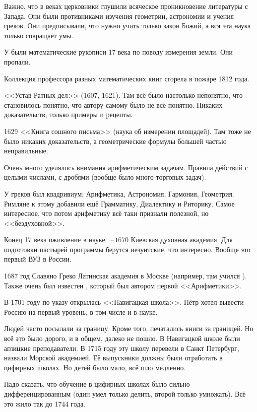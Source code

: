 \documentclass[a4paper,oneside,fleqn,10pt]{article}
\begin{document}
Важно, что в  веках церковники глушили всяческое проникновение литературы с Запада.
Они были противниками изучения геометрии, астрономии и учения греков. Они предписывали,
что нужно учить только закон Божий, а вся эта наука только совращает умы.

У  были математические рукописи 17 века по поводу измерения земли.
Они пропали.

Коллекция профессора  разных математических книг сгорела в пожаре 1812 года.

<<Устав Ратных дел>> (1607, 1621). Там всё было настолько непонятно, что становилось
понятно, что автору самому было не всё понятно. Никаких доказательств,
только примеры и рецепты.

1629 <<Книга сошного письма>> (наука об измерении площадей).
Там тоже не было никаких доказательств, а геометрические формулы большей частью неправильные.

Очень много уделялось внимания арифметическим задачам.
Правила действий с целыми числами, с дробями (вообще было много торговых
задач).

У греков был квадривиум: Арифметика, Астрономия, Гармония, Геометрия.
Римляне к этому добавили ещё  Грамматику, Диалектику и Риторику.
Самое интересное, что потом арифметику всё таки признали полезной, но <<бездуховной>>.

Конец 17 века оживление в науке. $\sim1670$ Киевская духовная академия.
Для подготовки пастырей программы берутся иезуитские, что интересно.
Вообще это первый ВУЗ в России.

1687 год Славяно Греко Латинская академия в Москве (например, там учился
). Также очень был известен , который был автором первой <<Арифметики>>.

В 1701 году по указу  открылась <<Навигацкая школа>>.
Пётр хотел вывести Россию на первый уровень, в том числе и в науке.

Людей часто посылали за границу. Кроме того, печатались книги за границей.
Но всё это было дорого, и в общем, далеко не пошло.
В Навигацкой школе были аглицкие преподаватели.  В 1715 году эту школу перевели
в Санкт Петербург, назвали Морской академией.
Её выпускники должны были отработать в цифирных школах.
Но детей было мало, всё шло медленно.

Надо сказать, что обучение в цифирных школах было сильно
дифференцированным (один умел только делить, второй только умножать).
Всё это жило так до 1744 года.
\end{document}
